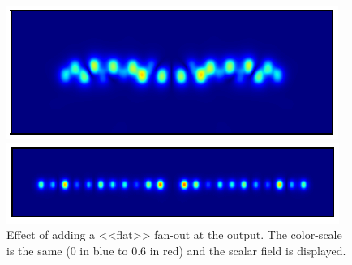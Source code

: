 \begin{figure}[htbp]
  \centering
  \begin{minipage}[b]{.45\textwidth}
    \centering
  \includegraphics[scale=.5]{picture/geometry/phase_180_14.png}
  \end{minipage}%
  \hspace{0.2 cm}
  \begin{minipage}[b]{.45\textwidth}
    \centering   \includegraphics[scale=.5]{picture/geometry/phase_180_14_plat.png}
  \end{minipage}
  \caption{Effect of adding a <<flat>> fan-out at the output. The
    color-scale is the same (0 in blue to 0.6 in red) and the scalar field is displayed.}
  \label{fig:outputfield}
\end{figure}

